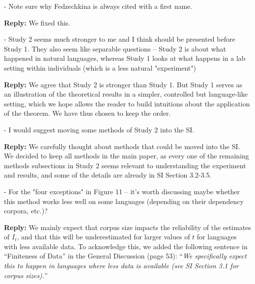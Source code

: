 \documentclass{article}[11pt,a4paper,oneside]
\newenvironment{reply}
  {\par\medskip
   \color{blue}%
   \begin{framed}
   \textbf{Reply: }\ignorespaces}
 {\end{framed}
  \medskip}
\begin{document}
- Note sure why Fedzechkina is always cited with a first name.

\begin{reply}
	We fixed this.
\end{reply}

- Study 2 seems much stronger to me and I think should be presented before Study 1. They also seem like separable questions -- Study 2 is about what happened in natural languages, whereas Study 1 looks at what happens in a lab setting within individuals (which is a less natural "experiment")

\begin{reply}
We agree that Study 2 is stronger than Study 1. But Study 1 serves as an illustration of the theoretical results in a simpler, controlled but language-like setting, which we hope allows the reader to build intuitions about the application of the theorem. We have thus chosen to keep the order.
	
\end{reply}

- I would suggest moving some methods of Study 2 into the SI.

\begin{reply}
We carefully thought about methods that could be moved into the SI. We decided to keep all methods in the main paper, as every one of the remaining methods subsections in Study 2 seems relevant to understanding the experiment and results, and some of the details are already in SI Section 3.2-3.5.
\end{reply}

- For the "four exceptions" in Figure 11 -- it's worth discussing maybe whether this method works less well on some languages (depending on their dependency corpora, etc.)?

\begin{reply}
We mainly expect that corpus size impacts the reliability of the estimates of $I_t$, and that this will be underestimated for larger values of $t$ for languages with less available data.
	To acknowledge this, we added the following sentence in ``Finiteness of Data'' in the General Discussion (page 53): ``\textit{We specifically expect this to happen in languages where less data is available (see SI Section 3.1 for corpus sizes).}''
\end{reply}
\end{document}
